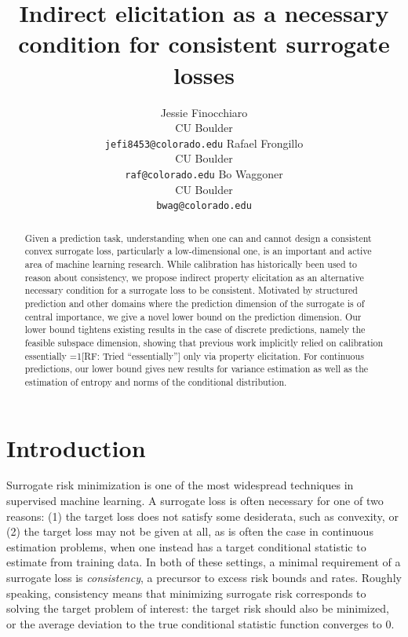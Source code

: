 \documentclass{article}
\title{Indirect elicitation as a necessary condition for consistent surrogate losses}
\author{%
  Jessie Finocchiaro\\
  CU Boulder\\
  \texttt{jefi8453@colorado.edu} 
  \And
   Rafael Frongillo\\
   CU Boulder\\
   \texttt{raf@colorado.edu} 
   \And
   Bo Waggoner\\
   CU Boulder \\
   \texttt{bwag@colorado.edu} 
}
\newcommand{\Comments}{1}
\newcommand{\mynote}[2]{\ifnum\Comments=1\textcolor{#1}{#2}\fi}
\newcommand{\raf}[1]{\mynote{green!80!blue}{[RF: #1]}}
\begin{document}
\maketitle

\begin{abstract}
Given a prediction task, understanding when one can and cannot design a consistent convex surrogate loss, particularly a low-dimensional one, is an important and active area of machine learning research. 
While calibration has historically been used to reason about consistency, we propose indirect property elicitation as an alternative necessary condition for a surrogate loss to be consistent. 
Motivated by structured prediction and other domains where the prediction dimension of the surrogate is of central importance, we give a novel lower bound on the prediction dimension. 
Our lower bound tightens existing results in the case of discrete predictions, namely the feasible subspace dimension, showing that previous work implicitly relied on calibration essentially \raf{Tried ``essentially''} only via property elicitation. 
For continuous predictions, our lower bound gives new results for variance estimation as well as the estimation of entropy and norms of the conditional distribution.
\end{abstract}

\section{Introduction}\label{sec:intro}

Surrogate risk minimization is one of the most widespread techniques in supervised machine learning.
A surrogate loss is often necessary for one of two reasons: (1) the target loss does not satisfy some desiderata, such as convexity, or (2) the target loss may not be given at all, as is often the case in continuous estimation problems, when one instead has a target conditional statistic to estimate from training data.
In both of these settings, a minimal requirement of a surrogate loss is \emph{consistency}, a precursor to excess risk bounds and rates.
Roughly speaking, consistency means that minimizing surrogate risk corresponds to solving the target problem of interest:
the target risk should also be minimized, or the average deviation to the true conditional statistic function converges to 0.
\end{document}
